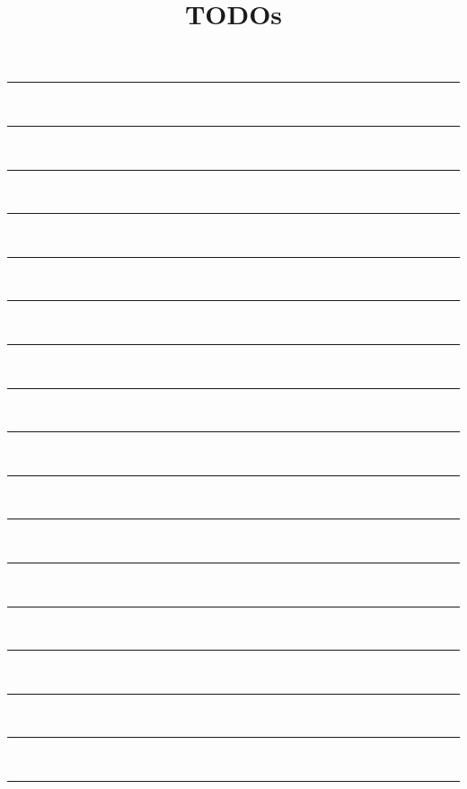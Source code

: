 \documentclass[11pt]{article}
\begin{document}
\title{TODOs}
\date{}
\maketitle
\thispagestyle{empty}
\newcommand{\myrule}{\noindent\rule{\textwidth}{0.4mm}\\\vfill}
\centering
\myrule
\myrule
\myrule
\myrule
\myrule
\myrule
\myrule
\myrule
\myrule
\myrule
\myrule
\myrule
\myrule
\myrule
\myrule
\myrule
\myrule
\end{document}
